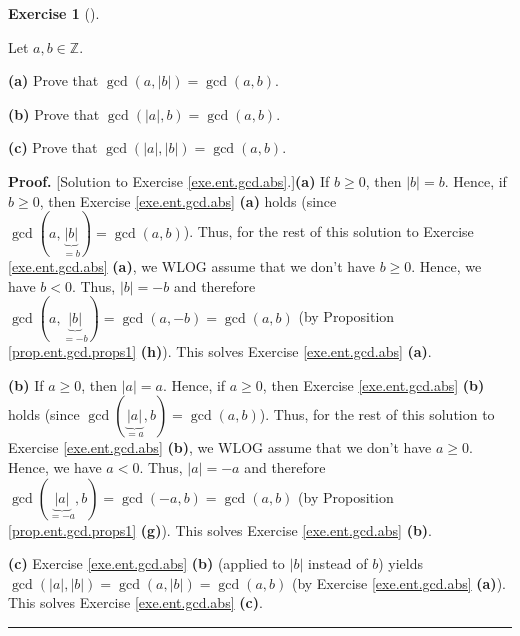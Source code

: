 \documentclass[numbers=enddot,12pt,final,onecolumn,notitlepage]{scrartcl}%
\newcounter{exer}
\numberwithin{exer}{subsection}
\theoremstyle{definition}
\newtheorem{exmp}[exer]{Exercise}
\newenvironment{exercise}[1][]
{\begin{exmp}[#1]\begin{leftbar}}
{\end{leftbar}\end{exmp}}
\newenvironment{fineprint}{\begin{small}}{\end{small}}
\newenvironment{proof}[1][Proof]{\noindent\textbf{#1.} }{\ \rule{0.5em}{0.5em}}
\begin{document}
\begin{exercise}
\label{exe.ent.gcd.abs}Let $a,b\in\mathbb{Z}$.

\textbf{(a)} Prove that $\gcd\left(  a,\left\vert b\right\vert \right)
=\gcd\left(  a,b\right)  $.

\textbf{(b)} Prove that $\gcd\left(  \left\vert a\right\vert ,b\right)
=\gcd\left(  a,b\right)  $.

\textbf{(c)} Prove that $\gcd\left(  \left\vert a\right\vert ,\left\vert
b\right\vert \right)  =\gcd\left(  a,b\right)  $.
\end{exercise}

\begin{fineprint}
\begin{proof}
[Solution to Exercise \ref{exe.ent.gcd.abs}.]\textbf{(a)} If $b\geq0$, then
$\left\vert b\right\vert =b$. Hence, if $b\geq0$, then Exercise
\ref{exe.ent.gcd.abs} \textbf{(a)} holds (since $\gcd\left(
a,\underbrace{\left\vert b\right\vert }_{=b}\right)  =\gcd\left(  a,b\right)
$). Thus, for the rest of this solution to Exercise \ref{exe.ent.gcd.abs}
\textbf{(a)}, we WLOG assume that we don't have $b\geq0$. Hence, we have
$b<0$. Thus, $\left\vert b\right\vert =-b$ and therefore $\gcd\left(
a,\underbrace{\left\vert b\right\vert }_{=-b}\right)  =\gcd\left(
a,-b\right)  =\gcd\left(  a,b\right)  $ (by Proposition
\ref{prop.ent.gcd.props1} \textbf{(h)}). This solves Exercise
\ref{exe.ent.gcd.abs} \textbf{(a)}.

\textbf{(b)} If $a\geq0$, then $\left\vert a\right\vert =a$. Hence, if
$a\geq0$, then Exercise \ref{exe.ent.gcd.abs} \textbf{(b)} holds (since
$\gcd\left(  \underbrace{\left\vert a\right\vert }_{=a},b\right)  =\gcd\left(
a,b\right)  $). Thus, for the rest of this solution to Exercise
\ref{exe.ent.gcd.abs} \textbf{(b)}, we WLOG assume that we don't have $a\geq
0$. Hence, we have $a<0$. Thus, $\left\vert a\right\vert =-a$ and therefore
$\gcd\left(  \underbrace{\left\vert a\right\vert }_{=-a},b\right)
=\gcd\left(  -a,b\right)  =\gcd\left(  a,b\right)  $ (by Proposition
\ref{prop.ent.gcd.props1} \textbf{(g)}). This solves Exercise
\ref{exe.ent.gcd.abs} \textbf{(b)}.

\textbf{(c)} Exercise \ref{exe.ent.gcd.abs} \textbf{(b)} (applied to
$\left\vert b\right\vert $ instead of $b$) yields $\gcd\left(  \left\vert
a\right\vert ,\left\vert b\right\vert \right)  =\gcd\left(  a,\left\vert
b\right\vert \right)  =\gcd\left(  a,b\right)  $ (by Exercise
\ref{exe.ent.gcd.abs} \textbf{(a)}). This solves Exercise
\ref{exe.ent.gcd.abs} \textbf{(c)}.
\end{proof}
\end{fineprint}
\end{document}
